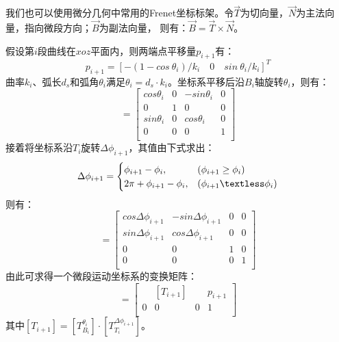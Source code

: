 我们也可以使用微分几何中常用的Frenet坐标标架\cite{用于光纤光栅曲线重建算法的坐标点拟合}。令$\vec T$为切向量，$\vec N$为主法向量，指向微段方向；$\vec B$为副法向量，
则有：$\vec B = \vec T \times \vec N$。

假设第$i$段曲线在$xoz$平面内，则两端点平移量$p_{i+1}$有：
\begin{equation}
    p_{i+1} = [-(1-cos \ \theta_i)/k_i \quad 0 \quad sin \ \theta_i/k_i]^T
\end{equation}
曲率$k_i$、弧长$d_s$和弧角$\theta_i$满足$\theta_i = d_s \cdot k_i$。坐标系平移后沿$B_i$轴旋转$\theta_i$，则有：
\begin{equation}
[T_{B_i} ^ {\theta_i}] = \left[
    \begin{matrix}
    cos \theta_i & 0 & -sin \theta_i & 0 \\
    0 &1 & 0 & 0 \\
    sin \theta_i & 0 & cos \theta_i & 0 \\
    0 & 0 & 0 & 1 \\
    \end{matrix}
\right]
\end{equation}
接着将坐标系沿$T_i$旋转$\Delta \phi_{i+1}$，其值由下式求出：
\begin{equation}
\Delta \phi_{i+1} = \begin{cases}
    \phi_{i+1} - \phi_i,&(\phi_{i+1} \ge \phi_i) \\
    2\pi + \phi_{i+1} - \phi_i,&(\phi_{i+1} \textless \phi_i)\\
\end{cases}
\end{equation}
则有：
\begin{equation}
[T_{T_i} ^ {\Delta\phi_{i+1}}] = \left[
    \begin{matrix}
    cos \Delta\phi_{i+1} & -sin \Delta\phi_{i+1} & 0 & 0 \\
    sin \Delta\phi_{i+1} & cos \Delta\phi_{i+1} & 0 & 0 \\
    0 & 0 & 1 & 0 \\
    0 & 0 & 0 & 1 \\
    \end{matrix}
\right]
\end{equation}
由此可求得一个微段运动坐标系的变换矩阵：
\begin{equation}
[t_{i+1}] = \left[
    \begin{matrix}
    & [T_{i+1}] & & p_{i+1} \\
    0 & 0 & 0 & 1 \\
    \end{matrix}
\right]
\end{equation}
其中$[T_{i+1}] = [T_{B_i} ^ {\theta_i}] \cdot [T_{T_i} ^ {\Delta\phi_{i+1}}]$。


